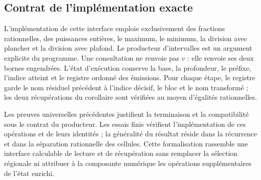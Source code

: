 \subsection{Contrat de l'implémentation exacte}
\label{subsec:residual-implementacion}

L'implémentation de cette interface emploie exclusivement des fractions
rationnelles, des puissances entières, le maximum, le minimum, la division avec plancher et la division
avec plafond. Le producteur d'intervalles est un argument explicite du
programme. Une consultation ne renvoie pas \(v\) : elle renvoie ses deux bornes engendrées.
L'état d'exécution conserve la base, la profondeur, le préfixe, l'indice atteint
et le registre ordonné des émissions. Pour chaque étape, le registre garde le
nom résiduel précédent à l'indice décisif, le bloc et le nom
transformé ; les deux récupérations du corollaire sont vérifiées au moyen
d'égalités rationnelles.

Les preuves universelles précédentes justifient la terminaison et la
compatibilité sous le contrat du producteur. Les essais finis vérifient
l'implémentation de ces opérations et de leurs identités ; la généralité
du résultat réside dans la récurrence et dans la séparation rationnelle des cellules.
Cette formalisation rassemble une interface calculable de lecture et de récupération
sans remplacer la sélection régionale ni attribuer à la composante numérique
les opérations supplémentaires de l'état enrichi.
